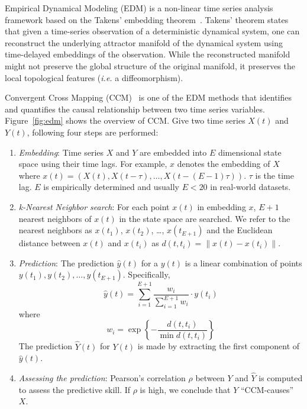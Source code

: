 \documentclass[sigconf]{acmart}
\begin{document}
Empirical Dynamical Modeling (EDM) is a non-linear time series analysis
framework based on the Takens' embedding theorem~\cite{Deyle2011}. Takens'
theorem states that given a time-series observation of a deterministic
dynamical system, one can reconstruct the underlying attractor manifold of the
dynamical system using time-delayed embeddings of the observation. While the
reconstructed manifold might not preserve the global structure of the original
manifold, it preserves the local topological features (\textit{i.e.} a
diffeomorphism).

Convergent Cross Mapping (CCM)~\cite{Sugihara2012,Natsukawa2017,VanBerkel2020}
is one of the EDM methods that identifies and quantifies the causal
relationship between two time series variables. Figure~\ref{fig:edm} shows the
overview of CCM\@. Give two time series $X(t)$ and $Y(t)$, following four
steps are performed:

\begin{enumerate}
    \item \textit{Embedding}: Time series $X$ and $Y$ are embedded into
        $E$ dimensional state space using their time lags. For example,
        $x$ denotes the embedding of $X$ where $x(t)=(X(t), X(t-\tau),
        \dots, X(t-(E-1) \tau))$. $\tau$ is the time lag. $E$ is
        empirically determined and usually $E<20$ in real-world datasets.
    \item \textit{k-Nearest Neighbor search}: For each point $x(t)$ in
        embedding $x$, $E+1$ nearest neighbors of $x(t)$ in the state space
        are searched. We refer to the nearest neighbors as $x(t_1)$, $x(t_2)$,
        \dots, $x(t_{E+1})$ and the Euclidean distance between $x(t)$ and
        $x(t_i)$ as $d(t, t_i) =\lVert x(t) - x(t_i) \rVert$.
    \item \textit{Prediction}: The prediction $\hat{y}(t)$ for a $y(t)$ is a
        linear combination of points $y(t_1), y(t_2), \dots, y(t_{E+1})$.
        Specifically,
        \begin{equation*}
            \hat{y}(t) = \sum^{E+1}_{i=1} \frac{w_i}{\sum^{E+1}_{i=1}{w_i}} \cdot y(t_i)
        \end{equation*}
        where
        \begin{equation*}
            w_i = \exp\left\{ -\frac{d(t, t_i)}{\min{d(t, t_i)}}\right\}
        \end{equation*}
        The prediction $\hat{Y}(t)$ for $Y(t)$ is made by extracting the first
        component of $\hat{y}(t)$.
    \item \textit{Assessing the prediction}: Pearson's correlation $\rho$
        between $Y$ and $\hat{Y}$ is computed to assess the predictive skill.
        If $\rho$ is high, we conclude that $Y$ ``CCM-causes'' $X$.
\end{enumerate}
\end{document}
